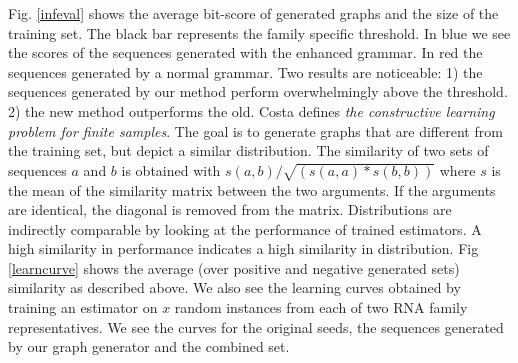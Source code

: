 \documentclass{article}
\begin{document}
Fig. \ref{infeval} shows the average bit-score of generated graphs
and the size of the training set. The black bar represents the family specific 
threshold. In blue we see the scores of the sequences generated with the
enhanced grammar. In red the sequences generated by a normal grammar. 
Two results are noticeable: 1) the sequences generated by our method
perform overwhelmingly above the threshold. 2) the new method outperforms
the old. 
Costa \cite{costa14} defines \emph{the constructive learning problem for 
finite samples}.
The goal is to generate graphs that are different from the training set,
but depict a similar distribution.
The similarity of two sets of sequences $a$ and $b$ 
is obtained with $s(a,b)/\sqrt{(s(a,a)*s(b,b))}$ where $s$ is the mean of the
similarity matrix between the two arguments. If the arguments are identical,
the diagonal is removed from the matrix.
Distributions are indirectly comparable by looking at the performance 
of trained estimators. A high similarity in performance indicates a high
similarity in distribution.
Fig \ref{learncurve} shows the average (over positive and negative generated sets)
similarity as described above. 
We also see the learning curves obtained by training an estimator
on $x$ random instances from each of two RNA family representatives.
We see the curves for the original seeds, the sequences generated by 
our graph generator and the combined set. 
\end{document}
